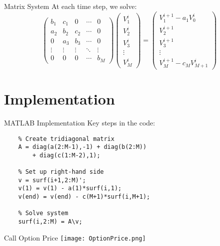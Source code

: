\documentclass{beamer}
\begin{document}
\begin{frame}{Matrix System}
    At each time step, we solve:
    \[
    \begin{pmatrix}
        b_1 & c_1 & 0 & \cdots & 0 \\
        a_2 & b_2 & c_2 & \cdots & 0 \\
        0 & a_3 & b_3 & \cdots & 0 \\
        \vdots & \vdots & \vdots & \ddots & \vdots \\
        0 & 0 & 0 & \cdots & b_M
    \end{pmatrix}
    \begin{pmatrix}
        V_1^i \\
        V_2^i \\
        V_3^i \\
        \vdots \\
        V_M^i
    \end{pmatrix}
    =
    \begin{pmatrix}
        V_1^{i+1} - a_1V_0^i \\
        V_2^{i+1} \\
        V_3^{i+1} \\
        \vdots \\
        V_M^{i+1} - c_MV_{M+1}^i
    \end{pmatrix}
    \]
\end{frame}

\section{Implementation}

\begin{frame}[fragile]{MATLAB Implementation}
    Key steps in the code:
    \begin{lstlisting}
    % Create tridiagonal matrix
    A = diag(a(2:M-1),-1) + diag(b(2:M)) 
        + diag(c(1:M-2),1);
    
    % Set up right-hand side
    v = surf(i+1,2:M)';
    v(1) = v(1) - a(1)*surf(i,1);
    v(end) = v(end) - c(M+1)*surf(i,M+1);
    
    % Solve system
    surf(i,2:M) = A\v;
    \end{lstlisting}
\end{frame}

\begin{frame}{Call Option Price}
            \texttt{[image: OptionPrice.png]}
\end{frame}
\end{document}
